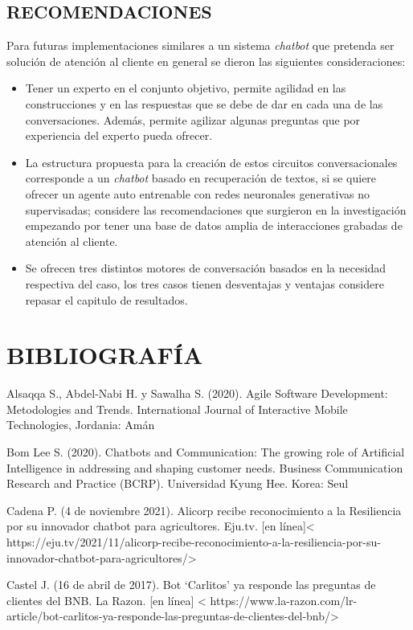 \documentclass[letter, openright, 12pt]{book}
\begin{document}
{\section{RECOMENDACIONES}
Para futuras implementaciones similares a un sistema \textit{chatbot} que pretenda ser solución de atención al cliente en general se dieron las siguientes consideraciones:

\begin{itemize}
\item Tener un experto en el conjunto objetivo, permite agilidad en las construcciones y en las respuestas que se debe de dar en cada una de las conversaciones. Además, permite agilizar algunas preguntas que por experiencia del experto pueda ofrecer.
\item La estructura propuesta para la creación de estos circuitos conversacionales corresponde a un \textit{chatbot} basado en recuperación de textos, si se quiere ofrecer un agente auto entrenable con redes neuronales generativas no supervisadas; considere las recomendaciones que surgieron en la investigación empezando por tener una base de datos amplia de interacciones grabadas de atención al cliente. 
\item Se ofrecen tres distintos motores de conversación basados en la necesidad respectiva del caso, los tres casos tienen desventajas y ventajas considere repasar el capitulo de resultados. 
\end{itemize}


\chapter*{BIBLIOGRAFÍA}
\begin{hangparas}{.35in}{1}
Alsaqqa S., Abdel-Nabi H. y Sawalha S. (2020). Agile Software Development: Metodologies and Trends. International Journal of Interactive Mobile Technologies, Jordania: Amán

Bom Lee S. (2020). Chatbots and Communication: The growing role of Artificial Intelligence in addressing and shaping customer needs. Business Communication Research and Practice (BCRP). Universidad Kyung Hee. Korea: Seul

Cadena P. (4 de noviembre 2021). Alicorp recibe reconocimiento a la Resiliencia por su innovador chatbot para agricultores. Eju.tv. [en línea]< https://eju.tv/2021/11/alicorp-recibe-reconocimiento-a-la-resiliencia-por-su-innovador-chatbot-para-agricultores/> 

Castel J. (16 de abril de 2017). Bot ‘Carlitos’ ya responde las preguntas de clientes del BNB. La Razon. [en línea] < https://www.la-razon.com/lr-article/bot-carlitos-ya-responde-las-preguntas-de-clientes-del-bnb/>


\end{hangparas}}
\end{document}
